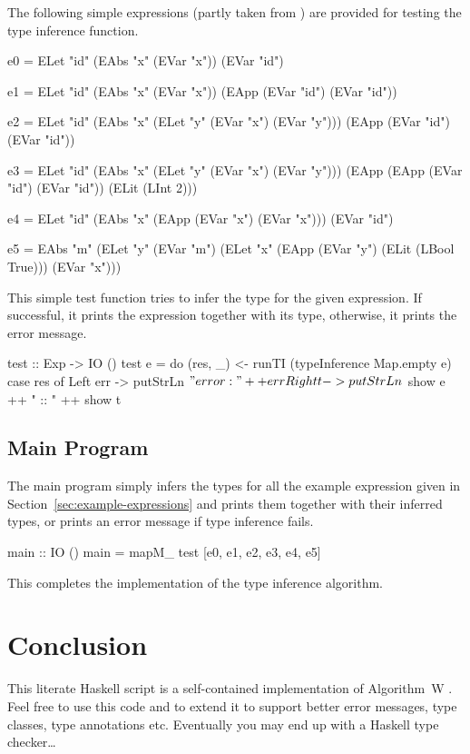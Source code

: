 \documentclass[a4paper,11pt]{article}
\begin{document}
The following simple expressions (partly taken from
\cite{Heeren2002GeneralizingHM}) are provided for testing the type
inference function.
%
\begin{code}
e0  =  ELet "id" (EAbs "x" (EVar "x"))
        (EVar "id")

e1  =  ELet "id" (EAbs "x" (EVar "x"))
        (EApp (EVar "id") (EVar "id"))

e2  =  ELet "id" (EAbs "x" (ELet "y" (EVar "x") (EVar "y")))
        (EApp (EVar "id") (EVar "id"))

e3  =  ELet "id" (EAbs "x" (ELet "y" (EVar "x") (EVar "y")))
        (EApp (EApp (EVar "id") (EVar "id")) (ELit (LInt 2)))

e4  =  ELet "id" (EAbs "x" (EApp (EVar "x") (EVar "x")))
        (EVar "id")

e5  =  EAbs "m" (ELet "y" (EVar "m")
                 (ELet "x" (EApp (EVar "y") (ELit (LBool True)))
                       (EVar "x")))
\end{code}
%
This simple test function tries to infer the type for the given
expression.  If successful, it prints the expression together with its
type, otherwise, it prints the error message.
%
\begin{code}
test :: Exp -> IO ()
test e =
    do  (res, _) <- runTI (typeInference Map.empty e)
        case res of
          Left err  ->  putStrLn $ "error: " ++ err
          Right t   ->  putStrLn $ show e ++ " :: " ++ show t
\end{code}

\subsection{Main Program}

The main program simply infers the types for all the example
expression given in Section~\ref{sec:example-expressions} and prints
them together with their inferred types, or prints an error message if
type inference fails.

\begin{code}
main :: IO ()
main = mapM_ test [e0, e1, e2, e3, e4, e5]
\end{code}
%
This completes the implementation of the type inference algorithm.

\section{Conclusion}

This literate Haskell script is a self-contained implementation of
Algorithm~W \cite{Milner1978Theory}.  Feel free to use this code and
to extend it to support better error messages, type classes, type
annotations etc.  Eventually you may end up with a Haskell type
checker\dots
\end{document}
